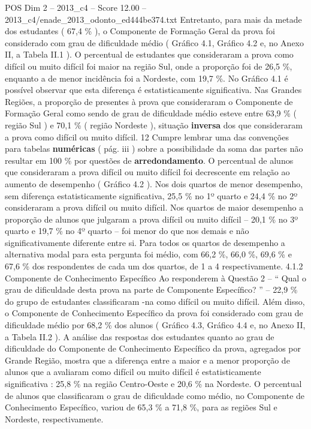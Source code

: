 \begin{textsample}{POS Dim 2 – 2013\_c4 – Score 12.00 – 2013\_c4/enade\_2013\_odonto\_ed444be374.txt}
Entretanto, para mais da metade dos estudantes ( 67,4 \% ), o Componente de Formação Geral da prova foi considerado com grau de dificuldade médio ( Gráfico 4.1, Gráfico 4.2 e, no Anexo II, a Tabela II.1 ).
O percentual de estudantes que consideraram a prova como difícil ou muito difícil foi maior na região Sul, onde a proporção foi de 26,5 \%, enquanto a de menor incidência foi a Nordeste, com 19,7 \%.
No Gráfico 4.1 é possível observar que esta diferença é estatisticamente significativa.
Nas Grandes Regiões, a proporção de presentes à prova que consideraram o Componente de Formação Geral como sendo de grau de dificuldade médio esteve entre 63,9 \% ( região Sul ) e 70,1 \% ( região Nordeste ), situação \textbf{inversa} dos que consideraram a prova como difícil ou muito difícil. 12 Cumpre lembrar uma das convenções para tabelas \textbf{numéricas} ( pág. iii ) sobre a possibilidade da soma das partes não resultar em 100 \% por questões de \textbf{arredondamento}.
O percentual de alunos que consideraram a prova difícil ou muito difícil foi decrescente em relação ao aumento de desempenho ( Gráfico 4.2 ).
Nos dois quartos de menor desempenho, sem diferença estatisticamente significativa, 25,5 \% no 1º quarto e 24,4 \% no 2º consideraram a prova difícil ou muito difícil.
Nos quartos de maior desempenho a proporção de alunos que julgaram a prova difícil ou muito difícil – 20,1 \% no 3º quarto e 19,7 \% no 4º quarto – foi menor do que nos demais e não significativamente diferente entre si.
Para todos os quartos de desempenho a alternativa modal para esta pergunta foi médio, com 66,2 \%, 66,0 \%, 69,6 \% e 67,6 \% dos respondentes de cada um dos quartos, de 1 a 4 respectivamente. 4.1.2 Componente de Conhecimento Específico Ao responderem à Questão 2 – “ Qual o grau de dificuldade desta prova na parte de Componente Específico? ” – 22,9 \% do grupo de estudantes classificaram -na como difícil ou muito difícil.
Além disso, o Componente de Conhecimento Específico da prova foi considerado com grau de dificuldade médio por 68,2 \% dos alunos ( Gráfico 4.3, Gráfico 4.4 e, no Anexo II, a Tabela II.2 ).
A análise das respostas dos estudantes quanto ao grau de dificuldade do Componente de Conhecimento Específico da prova, agregados por Grande Região, mostra que a diferença entre a maior e a menor proporção de alunos que a avaliaram como difícil ou muito difícil é estatisticamente significativa : 25,8 \% na região Centro-Oeste e 20,6 \% na Nordeste.
O percentual de alunos que classificaram o grau de dificuldade como médio, no Componente de Conhecimento Específico, variou de 65,3 \% a 71,8 \%, para as regiões Sul e Nordeste, respectivamente.

\end{textsample}
